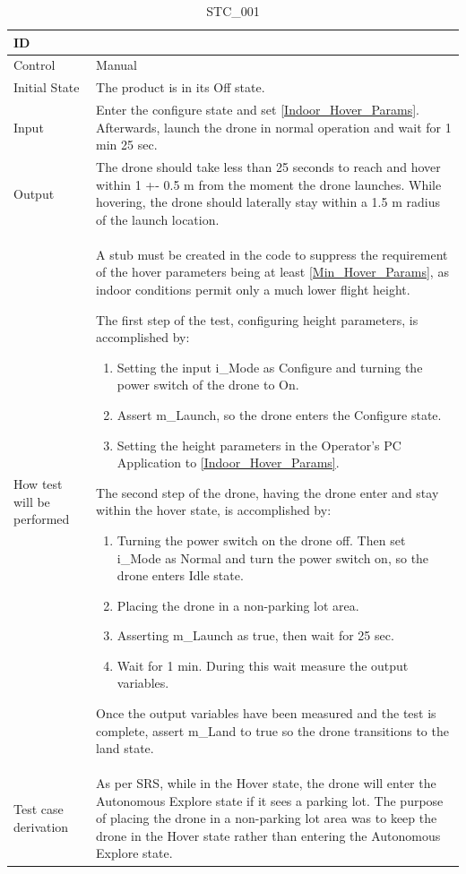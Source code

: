 \documentclass[12pt, titlepage]{article}
\begin{document}
\begin{table}[!h]
\begin{center}
\caption {STC\_001}
\label{tab:STC_001}
\begin{tabular}{ | m{1.5cm} | m{15cm} | } 
\hline
ID & \nameref{tab:STC_001} \\ 
\hline
Control & Manual \\ 
\hline
Initial State & The product is in its Off state. \\ 
\hline
Input & Enter the configure state and set \ref{Indoor_Hover_Params}. Afterwards, launch the drone in normal operation and wait for 1 min 25 sec. \\ 
\hline
Output & The drone should take less than 25 seconds to reach and hover within 1 +- 0.5 m from the moment the drone launches. While hovering, the drone should laterally stay within a 1.5 m radius of the launch location. \\ 
\hline
How test will be performed & A stub must be created in the code to suppress the requirement of the hover parameters being at least \ref{Min_Hover_Params}, as indoor conditions permit only a much lower flight height. 

The first step of the test, configuring height parameters, is accomplished by:
\begin{enumerate}[topsep=0pt,itemsep=-1ex,partopsep=1ex,parsep=1ex]
    \item Setting the input i\_Mode as Configure and turning the power switch of the drone to On.
    \item Assert m\_Launch, so the drone enters the Configure state.
    \item Setting the height parameters in the Operator's PC Application to \ref{Indoor_Hover_Params}.
\end{enumerate}
The second step of the drone, having the drone enter and stay within the hover state, is accomplished by:
\begin{enumerate}[topsep=0pt,itemsep=-1ex,partopsep=1ex,parsep=1ex]
	\item Turning the power switch on the drone off. Then set i\_Mode as Normal and turn the power switch on, so the drone enters Idle state.
	\item Placing the drone in a non-parking lot area. 
	\item Asserting m\_Launch as true, then wait for 25 sec.
	\item Wait for 1 min. During this wait measure the output variables.
\end{enumerate}
Once the output variables have been measured and the test is complete, assert m_Land to true so the drone transitions to the land state.\\ 
\hline
Test case derivation & As per SRS, while in the Hover state, the drone will enter the Autonomous Explore state if it sees a parking lot. The purpose of placing the drone in a non-parking lot area was to keep the drone in the Hover state rather than entering the Autonomous Explore state.


\end{tabular}
\end{center}
\end{table}
\end{document}
